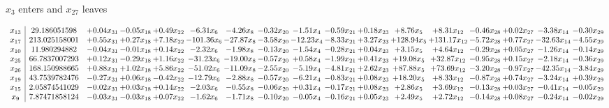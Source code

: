 \documentclass[9pt]{article}
\begin{document}
 $ x_{3} $ enters and $ x_{27} $ leaves 

 \[\begin{array}{c| c c@{\hskip 2pt} c@{\hskip 2pt} c@{\hskip 2pt} c@{\hskip 2pt} c@{\hskip 2pt} c@{\hskip 2pt} c@{\hskip 2pt} c@{\hskip 2pt} c@{\hskip 2pt} c@{\hskip 2pt} c@{\hskip 2pt} c@{\hskip 2pt} c@{\hskip 2pt} c@{\hskip 2pt} c@{\hskip 2pt} }
 x_{13}   &  29.186051598 & +  0.04 x_{31} & -0.05 x_{18} & +  0.49 x_{22} & -6.31 x_{6} & -4.26 x_{8} & -0.32 x_{20} & -1.51 x_{4} & -0.59 x_{21} & +  0.18 x_{23} & +  8.76 x_{5} & +  8.31 x_{12} & -0.46 x_{28} & +  0.02 x_{27} & -3.38 x_{14} & -0.30 x_{29}\\
 x_{17}   &  213.025158001 & +  0.55 x_{31} & +  0.27 x_{18} & +  7.18 x_{22} & -101.36 x_{6} & -27.87 x_{8} & -3.58 x_{20} & -12.23 x_{4} & -8.33 x_{21} & +  3.27 x_{23} & + 128.94 x_{5} & + 131.17 x_{12} & -5.72 x_{28} & +  0.77 x_{27} & -32.63 x_{14} & -4.55 x_{29}\\
 x_{10}   &  11.980294882 & -0.04 x_{31} & -0.01 x_{18} & +  0.14 x_{22} & -2.32 x_{6} & -1.98 x_{8} & -0.13 x_{20} & -1.54 x_{4} & -0.28 x_{21} & +  0.04 x_{23} & +  3.15 x_{5} & +  4.64 x_{12} & -0.29 x_{28} & +  0.05 x_{27} & -1.26 x_{14} & -0.14 x_{29}\\
 x_{25}   &  66.7837007293 & +  0.12 x_{31} & -0.29 x_{18} & +  1.16 x_{22} & -31.23 x_{6} & -19.00 x_{8} & -0.57 x_{20} & +  0.58 x_{4} & -1.99 x_{21} & +  0.41 x_{23} & + 19.08 x_{5} & + 32.87 x_{12} & -0.95 x_{28} & +  0.15 x_{27} & -2.18 x_{14} & -0.36 x_{29}\\
 x_{26}   &  168.150988665 & +  0.88 x_{31} & +  1.02 x_{18} & +  5.86 x_{22} & -51.02 x_{6} & -11.09 x_{8} & -2.55 x_{20} & -5.19 x_{4} & -4.81 x_{21} & +  2.62 x_{23} & + 87.88 x_{5} & + 73.69 x_{12} & -3.20 x_{28} & -0.97 x_{27} & -42.35 x_{14} & -3.84 x_{29}\\
 x_{19}   &  43.7539782476 & -0.27 x_{31} & +  0.06 x_{18} & -0.42 x_{22} & -12.79 x_{6} & -2.88 x_{8} & -0.57 x_{20} & -6.21 x_{4} & -0.83 x_{21} & +  0.08 x_{23} & + 18.20 x_{5} & +  8.33 x_{12} & -0.87 x_{28} & +  0.74 x_{27} & -3.24 x_{14} & +  0.39 x_{29}\\
 x_{15}   &  2.05874541029 & -0.02 x_{31} & +  0.03 x_{18} & +  0.14 x_{22} & -2.03 x_{6} & -0.55 x_{8} & -0.06 x_{20} & +  0.31 x_{4} & -0.17 x_{21} & +  0.08 x_{23} & +  2.86 x_{5} & +  3.69 x_{12} & -0.13 x_{28} & +  0.03 x_{27} & -0.41 x_{14} & -0.05 x_{29}\\
 x_{9}   &  7.87471858124 & -0.03 x_{31} & -0.03 x_{18} & +  0.07 x_{22} & -1.62 x_{6} & -1.71 x_{8} & -0.10 x_{20} & -0.05 x_{4} & -0.16 x_{21} & +  0.05 x_{23} & +  2.49 x_{5} & +  2.72 x_{12} & -0.14 x_{28} & +  0.08 x_{27} & -0.24 x_{14} & -0.02 x_{29}\\

\end{array}\]
\end{document}
